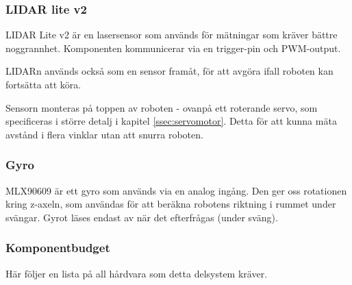 \documentclass[a4paper,11pt]{article}
\begin{document}
\subsubsection{LIDAR lite v2} \label{sssec:lidar}
LIDAR Lite v2 är en lasersensor som används för mätningar som kräver bättre noggrannhet. Komponenten kommunicerar via en trigger-pin och PWM-output.

LIDARn används också som en sensor framåt, för att avgöra ifall roboten kan fortsätta att köra.

Sensorn monteras på toppen av roboten - ovanpå ett roterande servo, som specificeras i större detalj i kapitel \ref{ssec:servomotor}. Detta för att kunna mäta avstånd i flera vinklar utan att snurra roboten.

\subsubsection{Gyro} \label{sssec:imu}
MLX90609 är ett gyro som används via en analog ingång. Den ger oss rotationen kring z-axeln, som användas för att beräkna robotens riktning i rummet under svängar.
Gyrot läses endast av när det efterfrågas (under sväng).

\subsubsection{Komponentbudget}
Här följer en lista på all hårdvara som detta delsystem kräver.

\begin{HardwareList}
\end{HardwareList}
\end{document}
